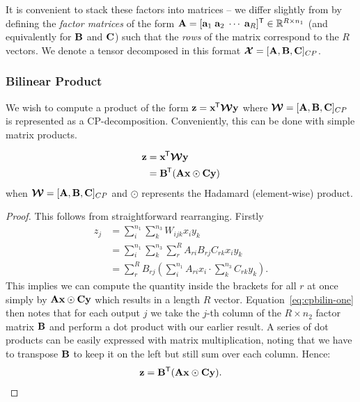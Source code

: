 It is convenient to stack these factors into matrices --
we differ slightly from \autocite{Kolda2009} by defining the \textit{factor matrices} of the 
form \(\mathbf{A} = [\mathbf{a}_1\;\mathbf{a}_2\;\cdots\;\mathbf{a}_R]^{\mathsf{T}} \in 
\mathbb{R}^{R\times n_1}\) (and equivalently for
\(\mathbf{B}\) and \(\mathbf{C}\)) such that the  \textit{rows} of the matrix correspond to the
\(R\) vectors. 
We denote a tensor decomposed in this format 
\(\bm{\mathcal{X}} = [\mathbf{A}, \mathbf{B}, \mathbf{C}]_{CP}\).

\subsubsection{Bilinear Product}
We wish to compute a product of the form \(\mathbf{z} = \mathbf{x}^{\mkern-1.5mu\mathsf{T}}\bm{\mathcal{W}}\mathbf{y}\)
where \(\bm{\mathcal{W}} = [\mathbf{A}, \mathbf{B}, \mathbf{C}]_{CP}\) is represented as a CP-decomposition.
Conveniently, this can be done with simple matrix products.

\begin{prop} \label{prop:cpbilin}
\begin{align}
	\mathbf{z} &= \mathbf{x}^{\mkern-1.5mu\mathsf{T}}\bm{\mathcal{W}}\mathbf{y} \\
			&= \mathbf{B}^{\mkern-1.5mu\mathsf{T}}(\mathbf{A}\mathbf{x} \odot \mathbf{C}\mathbf{y})
\end{align}
when \(\bm{\mathcal{W}} = [\mathbf{A}, \mathbf{B}, \mathbf{C}]_{CP}\) and \(\odot\) represents the Hadamard
(element-wise) product.
\end{prop}
\begin{proof}
This follows from straightforward rearranging. Firstly
\begin{align}
	z_j &= \sum_{i}^{n_1} \sum_k^{n_3} W_{ijk} x_i y_k \\
		&= \sum_{i}^{n_1} \sum_k^{n_3} \sum_r^R A_{ri} B_{rj} C_{rk} x_i y_k\\\label{eq:cpbilin-one}
		&= \sum_r^R B_{rj} \left( \sum_i^{n_1} A_{ri} x_i \cdot \sum_k^{n_3} C_{rk}y_k \right).
\end{align}
This implies we can compute the quantity inside the brackets for all \(r\) at once simply
by \(\mathbf{A}\mathbf{x} \odot \mathbf{C}\mathbf{y}\) which results in a length \(R\) vector. 
Equation~\eqref{eq:cpbilin-one} then notes that for each output \(j\) we take the \(j\)-th column
of the \(R \times n_2\) factor matrix \(\mathbf{B}\) and perform a dot product with our earlier
result. A series of dot products can be easily expressed with matrix multiplication, noting
that we have to transpose \(\mathbf{B}\) to keep it on the left but still sum over each column.
Hence:
\begin{equation}
	\mathbf{z} = \mathbf{B}^\mathsf{T} (\mathbf{A}\mathbf{x} \odot \mathbf{C}\mathbf{y}).
\end{equation}
\end{proof}

